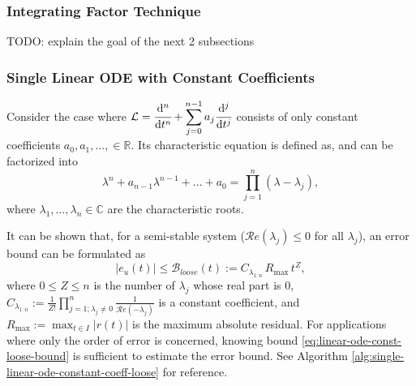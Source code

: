 \documentclass{article}
\newcommand{\dnt}[2]{\cfrac{\mathrm{d}^{#1} #2}{\mathrm{d} t^{#1}}}
\newcommand{\Err}{e}
\newcommand{\Bound}{\mathcal{B}}
\renewcommand{\L}{\mathcal{L}}
\renewcommand{\Re}[1]{\mathcal{R}e\left(#1\right)}
\begin{document}
\subsubsection{Integrating Factor Technique}
    TODO: explain the goal of the next 2 subsections
\subsubsection{Single Linear ODE with Constant Coefficients}\label{section:single-linear-ode-with-constant-coefficients}
    Consider the case where $\displaystyle \L = \dnt{n}{} + \sum_{j=0}^{n - 1} a_j \dnt{j}{}$ consists of only constant coefficients $a_0, a_1, \dots, \in \mathbb{R}$.
    Its characteristic equation is defined as, and can be factorized into
    \begin{equation} \label{eq:single-linear-ode-characteristic-polynomial-factorization}
        \lambda^n + a_{n-1}\lambda^{n-1} + \dots + a_0 = \prod_{j=1}^{n}(\lambda - \lambda_j),
    \end{equation}
    where $\lambda_1, \dots, \lambda_n \in \mathbb{C}$ are the characteristic roots. 

    It can be shown that, for a semi-stable system ($\Re{\lambda_j} \leq 0$ for all $\lambda_j$), an error bound can be formulated as
    \begin{equation} \label{eq:linear-ode-const-loose-bound}
        \left|\Err_u(t)\right| \leq \Bound_{loose}(t) := C_{\lambda_{1:n}}\, R_{\max}\, t^{Z},
    \end{equation}
    where $0\leq Z \leq n$ is the number of $\lambda_j$ whose real part is $0$, $\displaystyle C_{\lambda_{1:n}} := \frac{1}{Z!}\prod_{j=1; \lambda_j\neq 0}^{n} \frac{1}{\Re{-\lambda_j}}$ is a constant coefficient, and $\displaystyle R_{\max}:=\max_{t\in I} |r(t)|$ is the maximum absolute residual. 
    For applications where only the order of error is concerned, knowing bound \ref{eq:linear-ode-const-loose-bound} is sufficient to estimate the error bound. See Algorithm \ref{alg:single-linear-ode-constant-coeff-loose} for reference.
\end{document}
